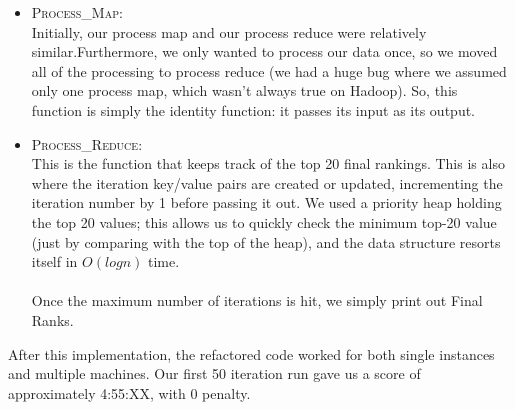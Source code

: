 \documentclass{article}
\begin{document}
\begin{itemize}
    \\ \\
    We did notice, however, that some datasets that we mined did not include NodeId entries for nodes that did not have any outgoing edges. The given datasets that were given did include entries for no outgoing edges, but according to Piazza, there may also be cases where no entries exist for such nodes. In this case, we would simply just create a new key/value pair with that NodeId, with 
    a self-loop, thereby adding an entry to the initial set of data.
    \\ \\
    In addition, for nodes with no outgoing edges, and thus no adjacency list, we added a new an adjacency list to itself so that it would contribute completely to itself, by definition of pagerank.\\ \\
    Just like PageRank Map, we do not deal with iterations here. We just pass them along.

    The output for this function is simply:
    \begin{center}
      NodeId:[NODEID] \hspace{8mm} [CURRENT\_RANK],[PREVIOUS\_RANK], [ADJACENCY\_LIST]
    \end{center}
    or
    \begin{center}
      `Iters' \hspace{8mm} [ITERATIONS]
    \end{center}

  \item \textsc{Process\_Map}: \\
    Initially, our process map and our process reduce were relatively similar.Furthermore, we only wanted to process our data once, so we moved all of the processing to process reduce (we had a huge bug where we assumed only one process map, which wasn't always true on Hadoop). So, this function is simply the identity function: it passes its input as its output.

  \item \textsc{Process\_Reduce}: \\
    This is the function that keeps track of the top 20 final rankings. This is also where the iteration key/value pairs are created or updated, incrementing the iteration number by 1 before passing it out. We used a 
    priority heap holding the top 20 values; this
    allows us to quickly check the minimum top-20 value (just by comparing with the top of the heap), and the data structure resorts itself in $O(log n)$ time.
    \\ \\
    Once the maximum number of iterations is hit, we simply print out Final Ranks.
\end{itemize}
After this implementation, the refactored code worked for both single instances and multiple machines. Our first 50 iteration run gave us a score of approximately 4:55:XX, with 0 penalty. 
\end{document}
